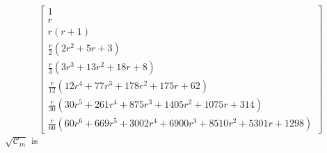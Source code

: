 \begin{displaymath}
\left[\begin{matrix}1 \\r \\r \left(r + 1\right) \\\frac{r}{2} \left(2 r^{2} + 5 r + 3\right) \\\frac{r}{3} \left(3 r^{3} + 13 r^{2} + 18 r + 8\right) \\\frac{r}{12} \left(12 r^{4} + 77 r^{3} + 178 r^{2} + 175 r + 62\right) \\\frac{r}{30} \left(30 r^{5} + 261 r^{4} + 875 r^{3} + 1405 r^{2} + 1075 r + 314\right) \\\frac{r}{60} \left(60 r^{6} + 669 r^{5} + 3002 r^{4} + 6900 r^{3} + 8510 r^{2} + 5301 r + 1298\right) \end{matrix}\right]
\end{displaymath}
$\sqrt{\mathcal{C}_{m}}$ is
